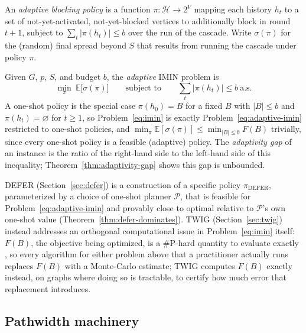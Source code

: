 \documentclass[ijoc,sglanonrev]{informs4}
\newcommand{\FF}{F}
\begin{document}
\begin{definition}\label{def:policy}
An \emph{adaptive blocking policy} is a function
$\pi:\mathcal H\to 2^V$ mapping each history $h_t$ to a set of
not-yet-activated, not-yet-blocked vertices to additionally block in round
$t+1$, subject to $\sum_{t}|\pi(h_t)|\le b$ over the run of the cascade.
Write $\sigma(\pi)$ for the (random) final spread beyond $S$ that results
from running the cascade under policy $\pi$.
\end{definition}

\begin{definition}\label{def:adaptive-imin}
Given $G$, $p$, $S$, and budget $b$, the \emph{adaptive} IMIN problem is
\begin{equation}\label{eq:adaptive-imin}
\min_{\pi}\ \mathbb E\bigl[\sigma(\pi)\bigr]
\qquad\text{subject to}\qquad
\textstyle\sum_t|\pi(h_t)|\le b\ \text{a.s.}
\end{equation}
A one-shot policy is the special case $\pi(h_0)=B$ for a fixed
$B$ with $|B|\le b$ and $\pi(h_t)=\varnothing$ for $t\ge1$, so
Problem~\eqref{eq:imin} is exactly Problem~\eqref{eq:adaptive-imin}
restricted to one-shot policies, and
$\min_\pi\mathbb E[\sigma(\pi)]\le\min_{|B|\le b}\FF(B)$ trivially, since
every one-shot policy is a feasible (adaptive) policy. The
\emph{adaptivity gap} of an instance is the ratio of the right-hand side to
the left-hand side of this inequality; Theorem~\ref{thm:adaptivity-gap}
shows this gap is unbounded.
\end{definition}

DEFER (Section~\ref{sec:defer}) is a construction of a specific policy
$\pi_{\mathrm{DEFER}}$, parameterized by a choice of one-shot planner
$\mathcal P$, that is feasible for Problem~\eqref{eq:adaptive-imin} and
provably close to optimal relative to $\mathcal P$'s own one-shot value
(Theorem~\ref{thm:defer-dominates}). TWIG (Section~\ref{sec:twig}) instead
addresses an orthogonal computational issue in Problem~\eqref{eq:imin}
itself: $\FF(B)$, the objective being optimized, is a \#P-hard quantity to
evaluate exactly \citep{valiant1979,provan1983}, so every algorithm for
either problem above that a practitioner actually runs replaces $\FF(B)$
with a Monte-Carlo estimate; TWIG computes $\FF(B)$ exactly instead, on
graphs where doing so is tractable, to certify how much error that
replacement introduces.

\subsection{Pathwidth machinery}\label{sec:treewidth-prelim}
\end{document}
